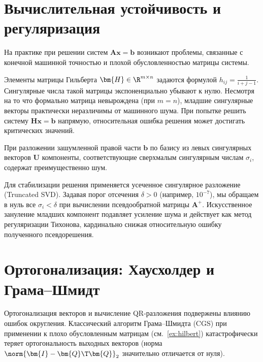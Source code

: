 \section{Вычислительная устойчивость и регуляризация}
\label{sec:stability}

На практике при решении систем $\bm{A}\bm{x} = \bm{b}$ возникают проблемы, связанные с конечной машинной точностью и плохой обусловленностью матрицы системы.

\begin{tcbexample}
\label{ex:hilbert}
    Элементы матрицы Гильберта $\bm{H} \in \R^{m \times n}$ задаются формулой $h_{ij} = \frac{1}{i+j-1}$.
    Сингулярные числа такой матрицы экспоненциально убывают к нулю. Несмотря на то что формально матрица невырождена (при $m=n$), младшие сингулярные векторы практически неразличимы от машинного шума. При попытке решить систему $\bm{H}\bm{x} = \bm{b}$ напрямую, относительная ошибка решения может достигать критических значений.
\end{tcbexample}

\begin{tcbinsight}
    При разложении зашумленной правой части $\bm{b}$ по базису из левых сингулярных векторов $\bm{U}$ компоненты, соответствующие сверхмалым сингулярным числам $\sigma_i$, содержат преимущественно шум. 
    
    Для стабилизации решения применяется усеченное сингулярное разложение (Truncated SVD). Задавая порог отсечения $\delta > 0$ (например, $10^{-7}$), мы обращаем в нуль все $\sigma_i < \delta$ при вычислении псевдообратной матрицы $\bm{A}^+$. Искусственное зануление младших компонент подавляет усиление шума и действует как метод регуляризации Тихонова, кардинально снижая относительную ошибку полученного псевдорешения.
\end{tcbinsight}

\section{Ортогонализация: Хаусхолдер и Грама--Шмидт}
\label{sec:orthogonalization}

Ортогонализация векторов и вычисление QR-разложения подвержены влиянию ошибок округления. Классический алгоритм Грама--Шмидта (CGS) при применении к плохо обусловленным матрицам (см.~\cref{ex:hilbert}) катастрофически теряет ортогональность выходных векторов (норма $\norm{\bm{I} - \bm{Q}\T\bm{Q}}_2$ значительно отличается от нуля).

